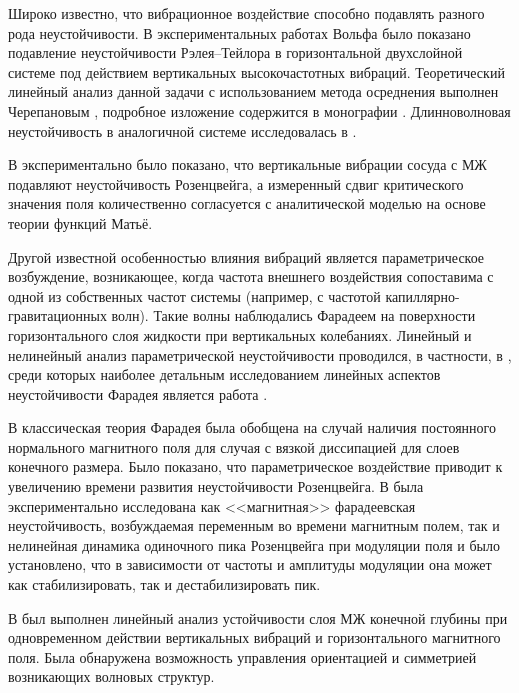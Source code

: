 \documentclass[12pt,a4paper]{article}
\begin{document}
Широко известно, что вибрационное воздействие способно подавлять разного рода неустойчивости. В экспериментальных работах Вольфа  \cite{Wolf1969, Wolf1970} было показано подавление неустойчивости Рэлея–Тейлора в горизонтальной двухслойной системе под действием вертикальных высокочастотных вибраций. Теоретический линейный анализ данной задачи с использованием метода осреднения выполнен Черепановым  \cite{Cherepanov1984}, подробное изложение содержится в монографии  \cite{Lyubimov2003}. Длинноволновая неустойчивость в аналогичной системе исследовалась в \cite{Lapuerta2001}.

В \cite{Ptrlis2000} экспериментально было показано, что вертикальные вибрации сосуда с МЖ подавляют неустойчивость Розенцвейга, а измеренный сдвиг критического значения поля количественно согласуется с аналитической моделью на основе теории функций Матьё. 


Другой известной особенностью влияния вибраций является параметрическое возбуждение, возникающее, когда частота внешнего воздействия сопоставима с одной из собственных частот системы (например, с частотой капиллярно-гравитационных волн). Такие волны наблюдались Фарадеем \cite{Faraday1831} на поверхности горизонтального слоя жидкости при вертикальных колебаниях. Линейный и нелинейный анализ параметрической неустойчивости проводился, в частности, в \cite{Benjamin1954, Lyubimov2003, Mancebo2002}, среди которых наиболее детальным исследованием линейных аспектов неустойчивости Фарадея является работа \cite{Mancebo2002}.

В \cite{Mller1998}  классическая теория Фарадея была обобщена на случай наличия постоянного нормального магнитного поля для случая с вязкой диссипацией для слоев конечного размера. Было показано, что параметрическое воздействие приводит к увеличению времени развития неустойчивости Розенцвейга. В \cite{Mahr1998a, Mahr1998b} была экспериментально исследована как <<магнитная>> фарадеевская неустойчивость, возбуждаемая переменным во времени магнитным полем, так и нелинейная динамика одиночного пика Розенцвейга при модуляции поля и было установлено, что в зависимости от частоты и амплитуды модуляции она может как стабилизировать, так и дестабилизировать пик. 

В \cite{Mekhonoshin2002} был выполнен линейный анализ устойчивости слоя МЖ конечной глубины при одновременном действии вертикальных вибраций и горизонтального магнитного поля. Была обнаружена возможность управления ориентацией и симметрией возникающих волновых структур. 
\end{document}
